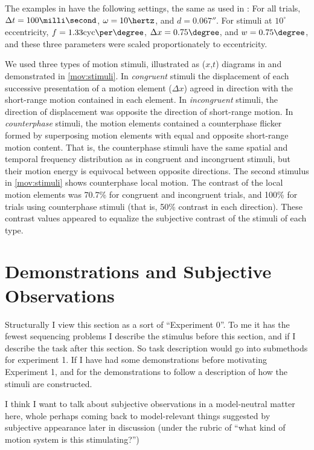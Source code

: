 \documentclass[english,jou]{article}
\newenvironment{lyxgreyedout}
  {\textcolor{note_fontcolor}\bgroup\ignorespaces}
  {\ignorespacesafterend\egroup}
\begin{document}
The examples in  have the following settings,
the same as used in : For all trials, $\Delta t = 100\milli\second$,
$\omega = 10 \hertz$,
and $d = 0.067\second$.
For stimuli at $10^{\circ}$ eccentricity, $f = 1.33 \mathrm{cyc}\per\degree$,
$\Delta x = 0.75 \degree$,
and $w = 0.75\degree$,
and these three parameters were scaled proportionately to eccentricity.

We used three types of motion stimuli, illustrated as ($x$,$t$)
diagrams in  and demonstrated in \ref{mov:stimuli}.
In \emph{congruent} stimuli the displacement of each successive presentation
of a motion element ($\Delta x$) agreed in direction with the short-range
motion contained in each element. In \emph{incongruent} stimuli, the
direction of displacement was opposite the direction of short-range
motion. In \emph{counterphase} stimuli, the motion elements contained
a counterphase flicker formed by superposing motion elements with
equal and opposite short-range motion content. That is, the counterphase
stimuli have the same spatial and temporal frequency distribution
as in congruent and incongruent stimuli, but their motion energy is
equivocal between opposite directions. The second stimulus in \ref{mov:stimuli}
shows counterphase local motion. The contrast of the local motion
elements was 70.7\% for congruent and incongruent trials, and 100\%
for trials using counterphase stimuli (that is, 50\% contrast in each
direction). These contrast values appeared to equalize the subjective
contrast of the stimuli of each type.


\section{Demonstrations and Subjective Observations\label{sec:lookatthis}}

\begin{lyxgreyedout}
Structurally I view this section as a sort of ``Experiment 0''.
To me it has the fewest sequencing problems I describe the stimulus
before this section, and if I describe the task after this section.
So task description would go into submethods for experiment 1. If
I have had some demonstrations before motivating Experiment 1, and
for the demonstrations to follow a description of how the stimuli
are constructed.

I think I want to talk about subjective observations in a model-neutral
matter here, whole perhaps coming back to model-relevant things suggested
by subjective appearance later in discussion (under the rubric of
``what kind of motion system is this stimulating?'')%
\end{lyxgreyedout}
\end{document}
